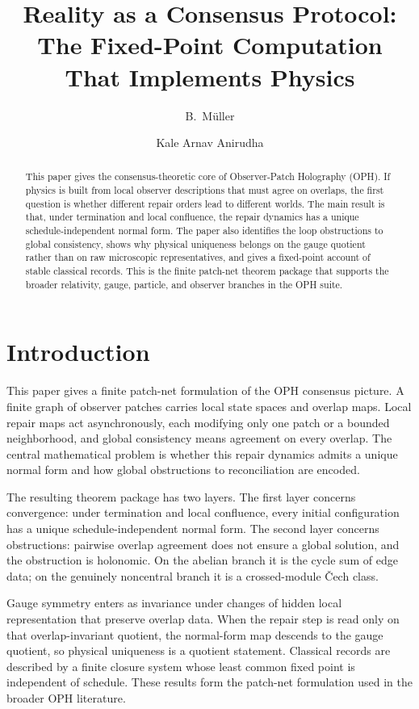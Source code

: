 \documentclass[11pt]{article}
\title{Reality as a Consensus Protocol:\\
The Fixed-Point Computation That Implements Physics}
\author{B.\ M\"uller \and Kale Arnav Anirudha}
\date{\OPHPaperReleaseDate}
\theoremstyle{remark}
\theoremstyle{plain}
\begin{document}
\maketitle
\OPHPaperReleaseBanner

\begin{abstract}
This paper gives the consensus-theoretic core of Observer-Patch Holography (OPH). If physics is built from local observer descriptions that must agree on overlaps, the first question is whether different repair orders lead to different worlds. The main result is that, under termination and local confluence, the repair dynamics has a unique schedule-independent normal form. The paper also identifies the loop obstructions to global consistency, shows why physical uniqueness belongs on the gauge quotient rather than on raw microscopic representatives, and gives a fixed-point account of stable classical records. This is the finite patch-net theorem package that supports the broader relativity, gauge, particle, and observer branches in the OPH suite.
\end{abstract}

\section{Introduction}

This paper gives a finite patch-net formulation of the OPH consensus picture. A finite graph of
observer patches carries local state spaces and overlap maps. Local repair maps act
asynchronously, each modifying only one patch or a bounded neighborhood, and global consistency
means agreement on every overlap. The central mathematical problem is whether this repair dynamics
admits a unique normal form and how global obstructions to reconciliation are encoded.

The resulting theorem package has two layers. The first layer concerns convergence: under
termination and local confluence, every initial configuration has a unique schedule-independent
normal form. The second layer concerns obstructions: pairwise overlap agreement does not ensure a
global solution, and the obstruction is holonomic. On the abelian branch it is the cycle sum of
edge data; on the genuinely noncentral branch it is a crossed-module \v{C}ech class.

Gauge symmetry enters as invariance under changes of hidden local representation that preserve
overlap data. When the repair step is read only on that overlap-invariant quotient, the
normal-form map descends to the gauge quotient, so physical uniqueness is a quotient statement.
Classical records are described by a finite closure system whose least common fixed point is
independent of schedule. These results form the patch-net formulation used in the broader OPH
literature.
\end{document}
